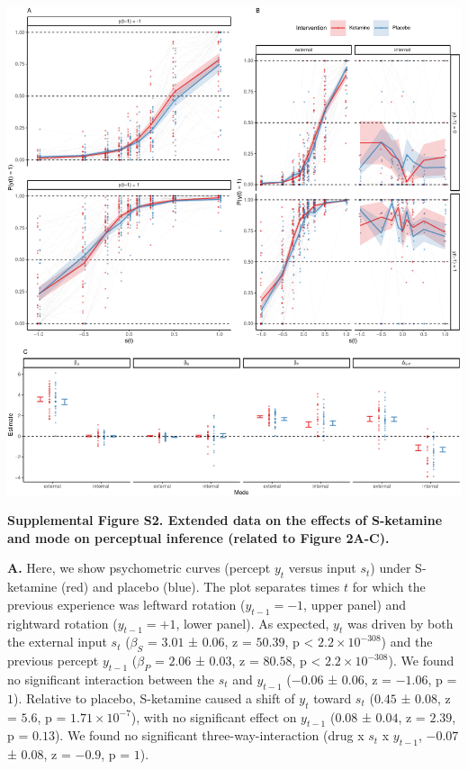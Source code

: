 \documentclass[
]{article}
\begin{document}
\includegraphics{modes_ketamine_scz_files/figure-latex/rev_Supplemental_Figure_S2-1.pdf}

\textbf{Supplemental Figure S2. Extended data on the effects of
S-ketamine and mode on perceptual inference (related to Figure 2A-C).}

\textbf{A.} Here, we show psychometric curves (percept \(y_t\) versus
input \(s_t\)) under S-ketamine (red) and placebo (blue). The plot
separates times \(t\) for which the previous experience was leftward
rotation (\(y_{t-1} = -1\), upper panel) and rightward rotation
(\(y_{t-1} = +1\), lower panel). As expected, \(y_t\) was driven by both
the external input \(s_t\) (\(\beta_S\) = \(3.01\) ± \(0.06\), z =
\(50.39\), p < \(\ensuremath{2.2\times 10^{-308}}\)) and the previous percept \(y_{t-1}\)
(\(\beta_{P}\) = \(2.06\) ± \(0.03\), z = \(80.58\), p < \(\ensuremath{2.2\times 10^{-308}}\)). We
found no significant interaction between the \(s_t\) and \(y_{t-1}\)
(\(-0.06\) ± \(0.06\), z = \(-1.06\), p = \(1\)). Relative to placebo,
S-ketamine caused a shift of \(y_t\) toward \(s_t\) (\(0.45\) ±
\(0.08\), z = \(5.6\), p = \(\ensuremath{1.71\times 10^{-7}}\)), with no
significant effect on \(y_{t-1}\) (\(0.08\) ± \(0.04\), z = \(2.39\), p
= \(0.13\)). We found no significant three-way-interaction (drug x
\(s_t\) x \(y_{t-1}\), \(-0.07\) ± \(0.08\), z = \(-0.9\), p = \(1\)).
\end{document}

